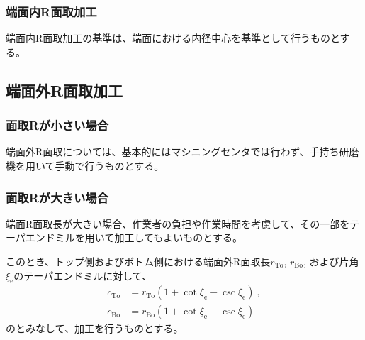 \subsubsection{端面内R面取加工}
端面内R面取加工の基準は、端面における内径中心を基準として行うものとする。


\subsection{端面外R面取加工}

\subsubsection{面取Rが小さい場合}
端面外R面取については、基本的にはマシニングセンタでは行わず、手持ち研磨機を用いて手動で行うものとする。

\subsubsection{面取Rが大きい場合}
端面R面取長が大きい場合、作業者の負担や作業時間を考慮して、その一部をテーパエンドミルを用いて加工してもよいものとする。

このとき、トップ側およびボトム側における端面外R面取長$r_\mathrm{To}$, $r_\mathrm{Bo}$, および片角$\xi_\mathrm e$のテーパエンドミルに対して、
\begin{align*}
  c_\mathrm{To} &= r_\mathrm{To}\left(1+\cot\xi_\mathrm e-\csc\xi_\mathrm e\right)\ ,\\
  c_\mathrm{Bo} &= r_\mathrm{Bo}\left(1+\cot\xi_\mathrm e-\csc\xi_\mathrm e\right)
\end{align*}
の\EndFaceOutChamferLength とみなして、\nameEndFaceOutChamfer 加工を行うものとする。


